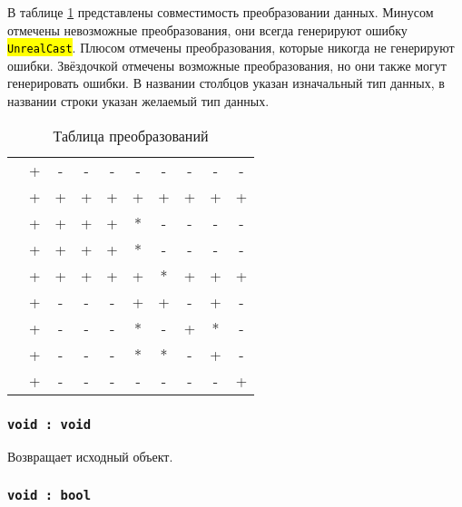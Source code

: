 \documentclass[a4paper, 14pt]{extarticle}
\newcommand{\ferror}[1]{{\fontsize{11pt}{12pt}\tt{\sethlcolor{yellow}\hl{#1}}}}
\begin{document}
В таблице \ref{castingtable} представлены совместимость преобразовании данных. Минусом отмечены невозможные преобразования, они всегда генерируют ошибку \ferror{UnrealCast}. Плюсом отмечены преобразования, которые никогда не генерируют ошибки. Звёздочкой отмечены возможные преобразования, но они также могут генерировать ошибки. В названии столбцов указан изначальный тип данных, в названии строки указан желаемый тип данных.

\begin{table}[htb]
	\caption{Таблица преобразований}
	\label{castingtable}
	\begin{tabular}{|l|c|c|c|c|c|c|c|c|c|}
		\hline
		          & \void & \bool & \integer & \double & \str & \listtype & \object & \set & \element \\ \hline
		\void     & +     & -     & -        & -       & -    & -         & -       & -    & -        \\ \hline
		\bool     & +     & +     & +        & +       & +    & +         & +       & +    & +        \\ \hline
		\integer  & +     & +     & +        & +       & *    & -         & -       & -    & -        \\ \hline
		\double   & +     & +     & +        & +       & *    & -         & -       & -    & -        \\ \hline
		\str      & +     & +     & +        & +       & +    & *         & +       & +    & +        \\ \hline
		\listtype & +     & -     & -        & -       & +    & +         & -       & +    & -        \\ \hline
		\object   & +     & -     & -        & -       & *    & -         & +       & *    & -        \\ \hline
		\set      & +     & -     & -        & -       & *    & *         & -       & +    & -        \\ \hline
		\element  & +     & -     & -        & -       & -    & -         & -       & -    & +        \\ \hline
	\end{tabular}
\end{table}

\subsubsection{\lstinline|void : void|}

Возвращает исходный объект.

\subsubsection{\lstinline|void : bool|}
\end{document}
